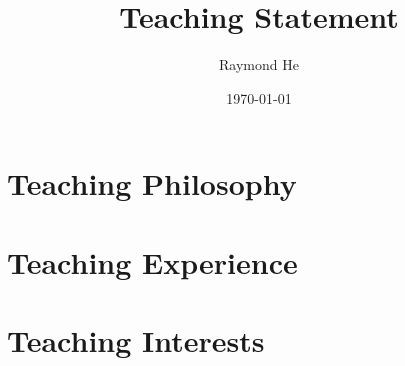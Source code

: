 \documentclass[11pt]{article}
\title{\textbf{Teaching Statement}}
\author{Raymond He}
\date{\today}
\begin{document}
\maketitle

\noindent

\section{Teaching Philosophy}


\noindent


\section{Teaching Experience}


\section{Teaching Interests}
\end{document}
